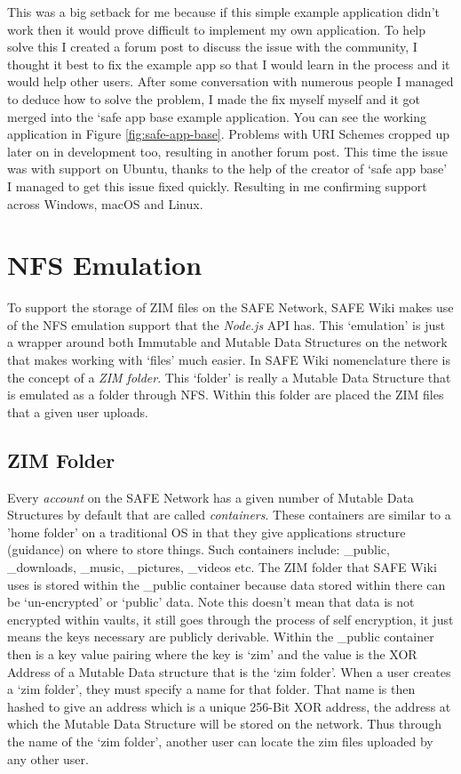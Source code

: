 This was a big setback for me because if this simple example application didn't work then it would prove difficult to implement my own application. To help solve this I created a forum post\cite{safe-app-base-forummacfix} to discuss the issue with the community, I thought it best to fix the example app so that I would learn in the process and it would help other users. After some conversation with numerous people I managed to deduce how to solve the problem, I made the fix myself myself\cite{safe-app-base-fix} and it got merged into the `safe app base example application. You can see the working application in Figure \ref{fig:safe-app-base}. Problems with URI Schemes cropped up later on in development too, resulting in another forum post\cite{uri-scheme-ubuntu}. This time the issue was with support on Ubuntu, thanks to the help of the creator of `safe app base' I managed to get this issue fixed quickly. Resulting in me confirming support across Windows, macOS and Linux.

\section{NFS Emulation}

To support the storage of ZIM files on the SAFE Network, SAFE Wiki makes use of the NFS emulation support that the \textit{Node.js} API has. This `emulation' is just a wrapper around both Immutable and Mutable Data Structures on the network that makes working with `files' much easier. In SAFE Wiki nomenclature there is the concept of a \textit{ZIM folder}. This `folder' is really a Mutable Data Structure that is emulated as a folder through NFS. Within this folder are placed the ZIM files that a given user uploads.

\subsection{ZIM Folder}

Every \textit{account} on the SAFE Network has a given number of Mutable Data Structures by default that are called \textit{containers}. These containers are similar to a 'home folder' on a traditional OS in that they give applications structure (guidance) on where to store things. Such containers include: \_public, \_downloads, \_music, \_pictures, \_videos etc. The ZIM folder that SAFE Wiki uses is stored within the \_public container because data stored within there can be `un-encrypted' or `public' data. Note this doesn't mean that data is not encrypted within vaults, it still goes through the process of self encryption, it just means the keys necessary are publicly derivable. Within the \_public container then is a key value pairing where the key is `zim' and the value is the XOR Address of a Mutable Data structure that is the `zim folder'. When a user creates a `zim folder', they must specify a name for that folder. That name is then hashed to give an address which is a unique 256-Bit XOR address, the address at which the Mutable Data Structure will be stored on the network. Thus through the name of the `zim folder', another user can locate the zim files uploaded by any other user.


